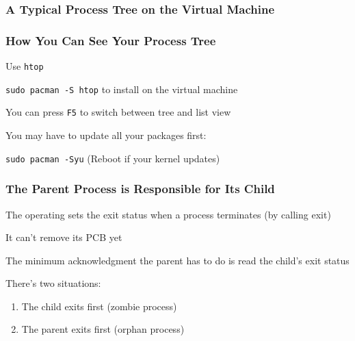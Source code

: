   \begin{frame}
    \frametitle{A Typical Process Tree on the Virtual Machine}

  \end{frame}

  \begin{frame}
    \frametitle{How You Can See Your Process Tree}

    Use \texttt{htop}

    \hspace{2em} \texttt{sudo pacman -S htop} to install on the virtual machine

    \vspace{2em}

    You can press \texttt{F5} to switch between tree and list view

    \vspace{2em}

    You may have to update all your packages first:

    \hspace{2em} \texttt{sudo pacman -Syu} (Reboot if your kernel updates)
  \end{frame}

  \begin{frame}
    \frametitle{The Parent Process is Responsible for Its Child}

    The operating sets the exit status when a process terminates (by calling exit)

    \hspace{2em} It can't remove its PCB yet

    \vspace{2em}

    The minimum acknowledgment the parent has to do is read the child's exit status

    \vspace{2em}

    There's two situations:
    \begin{enumerate}
      \item The child exits first (zombie process)
      \item The parent exits first (orphan process)
    \end{enumerate}
  \end{frame}


